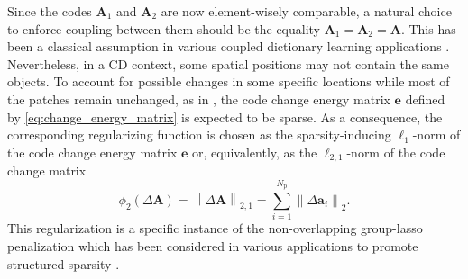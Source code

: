\documentclass[review]{elsarticle}
\newcommand{\Npatch}{N_{\mathrm{p}}}
\begin{document}
Since the codes $\mathbf{A}_{1}$ and $\mathbf{A}_{2}$ are now element-wisely comparable, a natural choice to enforce coupling between them should be the equality $\mathbf{A}_{1} = \mathbf{A}_{2} = \mathbf{A}$. This has been a classical assumption in various coupled dictionary learning applications \citep{yang_image_2010,zeyde_single_2010,yang_coupled_2012}. Nevertheless, in a CD context, some spatial positions may not contain the same objects. To account for possible changes in some specific locations while most of the patches remain unchanged, as in \citet{ferraris_robust_2017},  the code change energy matrix $\mathbf{e}$ defined by \eqref{eq:change_energy_matrix} is expected to be sparse. As a consequence, the corresponding regularizing function is chosen as the sparsity-inducing
$\ell_1$-norm of the code change energy matrix $\mathbf{e}$ or, equivalently, as the $\ell_{2,1}$-norm of the code change matrix
\begin{equation}
	\label{eq:phi_2}
	\phi_{2}\left(\Delta\mathbf{A}\right) = \left\|\Delta\mathbf{A}\right\|_{2,1} = \sum_{i=1}^{\Npatch} \left\|\Delta \mathbf{a}_i\right\|_2.
\end{equation}
This regularization is a specific instance of the non-overlapping group-lasso penalization \citep{bach_optimization_2011} which has been considered in various applications to promote structured sparsity \citep{wright_sparse_2009,fevotte_nonlinear_2015,ferraris_robust_2017}.
\end{document}
